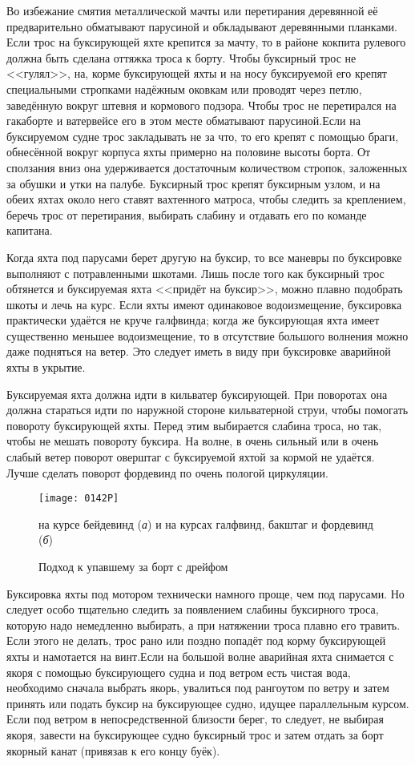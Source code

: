 Во избежание смятия металлической мачты или перетирания деревянной её предварительно обматывают парусиной и обкладывают деревянными планками. Если трос на буксирующей яхте крепится за мачту, то в районе кокпита рулевого должна быть сделана оттяжка троса к борту. Чтобы буксирный трос не <<гулял>>, на, корме буксирующей яхты и на носу буксируемой его крепят специальными стропками надёжным оковкам или проводят через петлю, заведённую вокруг штевня и кормового подзора. Чтобы трос не перетирался на гакаборте и ватервейсе его в этом месте обматывают парусиной.Если на буксируемом судне трос закладывать не за что, то его крепят с помощью браги, обнесённой вокруг корпуса яхты примерно на половине высоты борта. От сползания вниз она удерживается достаточным количеством стропок, заложенных за обушки и утки на палубе. Буксирный трос крепят буксирным узлом, и на обеих яхтах около него ставят вахтенного матроса, чтобы следить за креплением, беречь трос от перетирания, выбирать слабину и отдавать его по команде капитана.

Когда яхта под парусами берет другую на буксир, то все маневры по буксировке выполняют с потравленными шкотами. Лишь после того как буксирный трос обтянется и буксируемая яхта <<придёт на буксир>>, можно плавно подобрать шкоты и лечь на курс. Если яхты имеют одинаковое водоизмещение, буксировка практически удаётся не круче галфвинда; когда же буксирующая яхта имеет существенно меньшее водоизмещение, то в отсутствие большого волнения можно даже подняться на ветер. Это следует иметь в виду при буксировке аварийной яхты в укрытие.

Буксируемая яхта должна идти в кильватер буксирующей. При поворотах она должна стараться идти по наружной стороне кильватерной струи, чтобы помогать повороту буксирующей яхты. Перед этим выбирается слабина троса, но так, чтобы не мешать повороту буксира. На волне, в очень сильный или в очень слабый ветер поворот оверштаг с буксируемой яхтой за кормой не удаётся. Лучше сделать поворот фордевинд по очень пологой циркуляции.

\begin{figure*}[htb]
  \centering{}
  \texttt{[image: 0142P]}
  \caption{Подход к упавшему за борт с дрейфом}
  \label{fig:142}
  \small
  \centering{}
  на курсе бейдевинд (\textit{а}) и на курсах галфвинд, бакштаг и фордевинд (\textit{б})
\end{figure*}

Буксировка яхты под мотором технически намного проще, чем под парусами. Но следует особо тщательно следить за появлением слабины буксирного троса, которую надо немедленно выбирать, а при натяжении троса плавно его травить. Если этого не делать, трос рано или поздно попадёт под корму буксирующей яхты и намотается на винт.Если на большой волне аварийная яхта снимается с якоря с помощью буксирующего судна и под ветром есть чистая вода, необходимо сначала выбрать якорь, увалиться под рангоутом по ветру и затем принять или подать буксир на буксирующее судно, идущее параллельным курсом. Если под ветром в непосредственной близости берег, то следует, не выбирая якоря, завести на буксирующее судно буксирный трос и затем отдать за борт якорный канат (привязав к его концу буёк).

